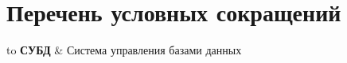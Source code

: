 \chapter*{Перечень условных сокращений}             %
\noindent
\begin{longtabu} to \textwidth {r X}
\textbf{СУБД} & Система управления базами данных\\
\end{longtabu}
\addtocounter{table}{-1}%
